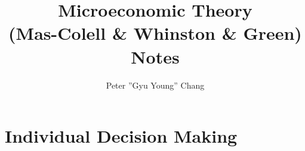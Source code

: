 \documentclass[11pt,twoside=semi,openright,numbers=noenddot]{article}
\title{Microeconomic Theory \\ (Mas-Colell \& Whinston \& Green) \\ Notes}
\author{Peter ''Gyu Young'' Chang}
\begin{document}
\maketitle
\newpage
\tableofcontents
\newpage

\part{Individual Decision Making}
\label{part:part1}
\parttoc

\end{document}
